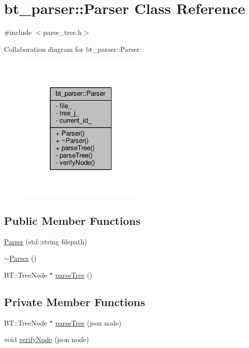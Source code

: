 \hypertarget{classbt__parser_1_1Parser}{\section{bt\-\_\-parser\-:\-:Parser Class Reference}
\label{classbt__parser_1_1Parser}
}


{\ttfamily \#include $<$parse\-\_\-tree.\-h$>$}



Collaboration diagram for bt\-\_\-parser\-:\-:Parser\-:
\nopagebreak
\begin{figure}[H]
\begin{center}
\leavevmode
\includegraphics[width=172pt]{d2/d92/classbt__parser_1_1Parser__coll__graph}
\end{center}
\end{figure}
\subsection*{Public Member Functions}
\begin{DoxyCompactItemize}
\item 
\hyperlink{classbt__parser_1_1Parser_abcd6235386f006f36b56ceb08c898deb_abcd6235386f006f36b56ceb08c898deb}{Parser} (std\-::string filepath)
\item 
\hyperlink{classbt__parser_1_1Parser_a5a8992b935e01bac1fa36da4d20eb718_a5a8992b935e01bac1fa36da4d20eb718}{$\sim$\-Parser} ()
\item 
B\-T\-::\-Tree\-Node $\ast$ \hyperlink{classbt__parser_1_1Parser_a7c744cc625df4ce26fbaa3deba496737_a7c744cc625df4ce26fbaa3deba496737}{parse\-Tree} ()
\end{DoxyCompactItemize}
\subsection*{Private Member Functions}
\begin{DoxyCompactItemize}
\item 
B\-T\-::\-Tree\-Node $\ast$ \hyperlink{classbt__parser_1_1Parser_a30c924ebeff1273b8612c41bd5e7ffe2_a30c924ebeff1273b8612c41bd5e7ffe2}{parse\-Tree} (json node)
\item 
void \hyperlink{classbt__parser_1_1Parser_a67d8ea4c25f3088b8e5b18cc01837d1a_a67d8ea4c25f3088b8e5b18cc01837d1a}{verify\-Node} (json node)
\end{DoxyCompactItemize}
